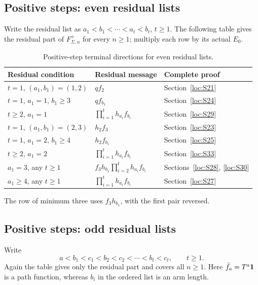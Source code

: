 \subsection{Positive steps: even residual lists}
Write the residual list as $a_1<b_1<\cdots<a_t<b_t$, $t\ge1$. The following table gives the residual part of $F^+_{\Sigma,n}$ for every $n\ge1$; multiply each row by its actual $E_0$.

\begin{table}[htbp]
\centering
\caption{Positive-step terminal directions for even residual lists.}\label{tab:terminal-even}
\fontsize{9}{11}\selectfont
\setlength{\tabcolsep}{1pt}\noindent\begin{tabular}{@{}p{57mm}p{68mm}p{29mm}@{}}
\toprule
Residual condition & Residual message & Complete proof\\\midrule
$t=1$, $(a_1,b_1)=(1,2)$ & $qf_2$ & Section~\ref{loc:S21}\\
$t=1$, $a_1=1$, $b_1\ge3$ & $qf_{b_1}$ & Section~\ref{loc:S24}\\
$t\ge2$, $a_1=1$ & $\prod_{i=1}^t h_{a_i}f_{b_i}$ & Section~\ref{loc:S29}\\
$t=1$, $(a_1,b_1)=(2,3)$ & $h_2f_3$ & Section~\ref{loc:S23}\\
$t=1$, $a_1=2$, $b_1\ge4$ & $h_2f_{b_1}$ & Section~\ref{loc:S25}\\
$t\ge2$, $a_1=2$ & $\prod_{i=1}^t h_{a_i}f_{b_i}$ & Section~\ref{loc:S33}\\
$a_1=3$, any $t\ge1$ & $f_3h_{b_1}\prod_{i=2}^t h_{a_i}f_{b_i}$ & Sections~\ref{loc:S28}, \ref{loc:S30}\\
$a_1\ge4$, any $t\ge1$ & $\prod_{i=1}^t h_{a_i}f_{b_i}$ & Section~\ref{loc:S27}\\
\bottomrule
\end{tabular}

\end{table}

The row of minimum three uses $f_3h_{b_1}$, with the first pair reversed.

\subsection{Positive steps: odd residual lists}
Write
\[
 a<b_1<c_1<b_2<c_2<\cdots<b_t<c_t,\qquad t\ge1.
\]
Again the table gives only the residual part and covers all $n\ge1$. Here $\bar f_a=T^a\mathbf1$ is a path function, whereas $b_i$ in the ordered list is an arm length.

